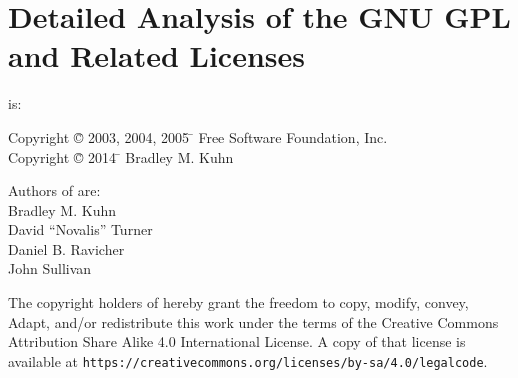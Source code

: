 %





\newcommand{\defn}[1]{\emph{#1}}

\part{Detailed Analysis of the GNU GPL and Related Licenses}

\begin{center}

{\parindent 0in
 is: \\
\begin{tabbing}
Copyright \= \copyright{} 2003, 2004, 2005 \= \hspace{.2in} Free Software Foundation, Inc. \\
Copyright \= \copyright{} 2014 \= \hspace{.2in} Bradley M. Kuhn \\
\end{tabbing}

Authors of  are: \\

Bradley M. Kuhn \\
David ``Novalis'' Turner \\
Daniel B. Ravicher \\
John Sullivan

\vspace{.3in}

The copyright holders of  hereby grant the freedom to copy, modify,
convey, Adapt, and/or redistribute this work under the terms of the Creative
Commons Attribution Share Alike 4.0 International License.  A copy of that
license is available at
\verb=https://creativecommons.org/licenses/by-sa/4.0/legalcode=.  }

\end{center}

